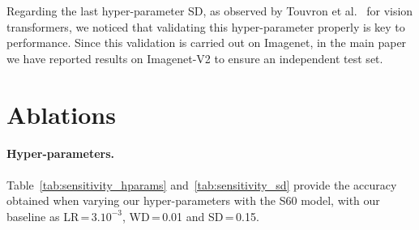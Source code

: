 Regarding the last hyper-parameter SD, as observed by Touvron et al.~\cite{touvron2021going} for vision transformers, we noticed that validating this hyper-parameter properly is key to performance. Since this validation is carried out on Imagenet, in the main paper we have reported results on Imagenet-V2 to ensure an independent test set. 


\section{Ablations}
% 

\paragraph{Hyper-parameters. }
% 
Table~\ref{tab:sensitivity_hparams} and~\ref{tab:sensitivity_sd} provide the accuracy obtained when varying our hyper-parameters with the S60 model, with our baseline as LR\,=\,$3.10^{-3}$, WD\,=\,0.01 and SD\,=\,0.15. 



